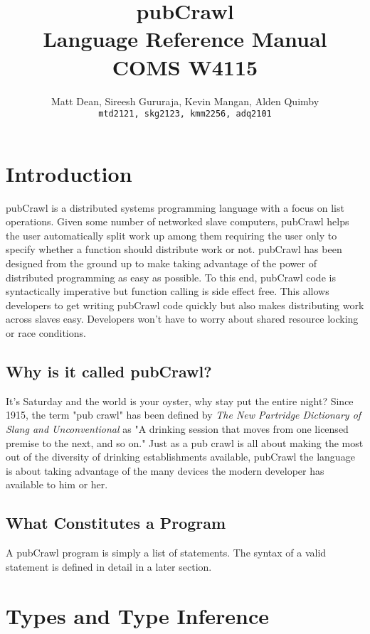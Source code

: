 \documentclass[oneside]{book}
\title{
  pubCrawl \\ Language Reference Manual \\ \vspace{2 mm}
  \large{COMS W4115}
}
\author{
  Matt Dean, Sireesh Gururaja, Kevin Mangan, Alden Quimby\\
  \texttt{mtd2121, skg2123, kmm2256, adq2101}
}
\begin{document}
\maketitle
\tableofcontents


\chapter{Introduction}
pubCrawl is a distributed systems programming language with a focus on list operations. Given some number of networked slave computers, pubCrawl helps the user automatically split work up among them requiring the user only to specify whether a function should distribute work or not. pubCrawl has been designed from the ground up to make taking advantage of the power of distributed programming as easy as possible. To this end, pubCrawl code is syntactically imperative but function calling is side effect free. This allows developers to get writing pubCrawl code quickly but also makes distributing work across slaves easy. Developers won't have to worry about shared resource locking or race conditions. 

\section{Why is it called pubCrawl?}
It's Saturday and the world is your oyster, why stay put the entire night? Since 1915, the term "pub crawl" has been defined by \textit{The New Partridge Dictionary of Slang and Unconventional} as "A drinking session that moves from one licensed premise to the next, and so on." Just as a pub crawl is all about making the most out of the diversity of drinking establishments available, pubCrawl the language is about taking advantage of the many devices the modern developer has available to him or her. 

\section{What Constitutes a Program}
A pubCrawl program is simply a list of statements. The syntax of a valid statement is defined in detail in a later section.


\chapter{Types and Type Inference}
\end{document}
